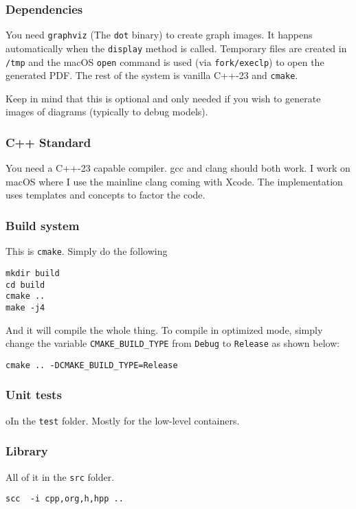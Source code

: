 \documentclass[11pt]{article}
\begin{document}
\subsubsection{Dependencies}
\label{sec:org7a80238}
You need \texttt{graphviz} (The \texttt{dot} binary) to create graph images. It happens
automatically when the \texttt{display} method is called. Temporary files are created
in \texttt{/tmp} and the macOS \texttt{open} command is used (via \texttt{fork/execlp})  to open the generated PDF. The rest of the system is vanilla C++-23 and \texttt{cmake}.
\begin{hint}
Keep in mind that this is optional and only needed if you wish to generate images of
diagrams (typically to debug models).
\end{hint}
\subsubsection{C++ Standard}
\label{sec:orgab29937}
You need a C++-23 capable compiler. gcc and clang should both work. I work on macOS where I use the mainline clang coming with Xcode. The implementation uses templates and concepts to factor the code.
\subsubsection{Build system}
\label{sec:orgf07e095}
This is \texttt{cmake}. Simply do the following
\begin{verbatim}
mkdir build
cd build
cmake ..
make -j4
\end{verbatim}
And it will compile the whole thing. To compile in optimized mode, simply change
the variable \texttt{CMAKE\_BUILD\_TYPE} from \texttt{Debug} to \texttt{Release} as shown below:
\begin{verbatim}
cmake .. -DCMAKE_BUILD_TYPE=Release
\end{verbatim}
\subsubsection{Unit tests}
\label{sec:orgab31dce}
oIn the \texttt{test} folder. Mostly for the low-level containers.
\subsubsection{Library}
\label{sec:orgd901705}
All of it in the \texttt{src} folder.
\begin{verbatim}
scc  -i cpp,org,h,hpp ..
\end{verbatim}
\end{document}
